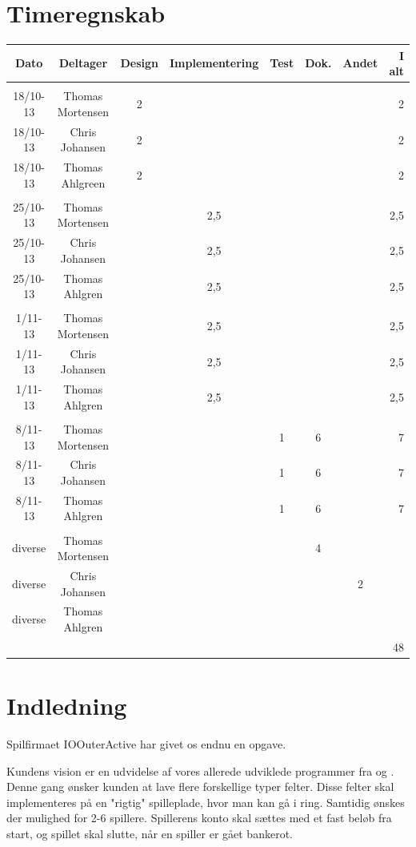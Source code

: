 \documentclass{article}
\begin{document}
\section*{Timeregnskab}
\begin{tabular}{|c|c|c|c|c|c|c|r|} \hline
 Dato & Deltager & Design & Implementering & Test & Dok. & Andet & I alt \\ \hline
&&&&&&& \\ \hline
 18/10-13 & Thomas Mortensen & 2& & & & & 2\\ \hline
 18/10-13 & Chris Johansen & 2& & & & &2 \\ \hline
 18/10-13 & Thomas Ahlgreen & 2& & & & & 2\\ \hline
 &&&&&&& \\ \hline
 25/10-13 & Thomas Mortensen & & 2,5& & & &2,5 \\ \hline
 25/10-13 & Chris Johansen & &2,5 & & & &2,5 \\ \hline
 25/10-13 & Thomas Ahlgren & & 2,5& & & &2,5 \\ \hline
 &&&&&&& \\ \hline
 1/11-13 & Thomas Mortensen & &2,5 & & & &2,5 \\ \hline
 1/11-13 & Chris Johansen & &2,5 & & & & 2,5 \\ \hline
 1/11-13 & Thomas Ahlgren & &2,5 & & & & 2,5 \\ \hline
 &&&&&&& \\ \hline
 8/11-13 & Thomas Mortensen & & &1 &6 & &7 \\ \hline
 8/11-13 & Chris Johansen & & &1 &6 & &7 \\ \hline
 8/11-13 & Thomas Ahlgren & & &1 &6 & &7 \\ \hline
 &&&&&&& \\ \hline
 diverse & Thomas Mortensen & & & &4 & & \\ \hline
 diverse & Chris Johansen & & & & &2 & \\ \hline
 diverse & Thomas Ahlgren & & & & & & \\ \hline
 &&&&&&& 48\\ \hline
\end{tabular}
\newpage
\tableofcontents
\newpage
\section{Indledning}
Spilfirmaet IOOuterActive har givet os endnu en opgave.

Kundens vision er en udvidelse af vores allerede udviklede programmer fra \cite{del1} og \cite{del2}.
Denne gang ønsker kunden at lave flere forskellige typer felter. Disse felter skal implementeres på en "rigtig" spilleplade, hvor man kan gå i ring. Samtidig ønskes der mulighed for 2-6 spillere. Spillerens konto skal sættes med et fast beløb fra start, og spillet skal slutte, når en spiller er gået bankerot.
\end{document}
